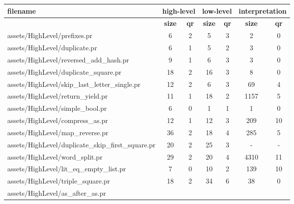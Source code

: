 \begin{tabular}{|l|c|c|c|c|c|c|}
    \toprule
    \textbf{filename} & \multicolumn{2}{c|}{\textbf{high-level}} & \multicolumn{2}{c|}{\textbf{low-level}} & \multicolumn{2}{c|}{\textbf{interpretation}} \\
    \midrule
                      & \textbf{size} & \textbf{qr} & \textbf{size} & \textbf{qr} & \textbf{size} & \textbf{qr} \\
    \midrule
            assets/HighLevel/prefixes.pr &
        6 & 2 &
         5 & 3  &
         2 & 0  \\
            assets/HighLevel/duplicate.pr &
        6 & 1 &
         5 & 2  &
         3 & 0  \\
            assets/HighLevel/reversed\_add\_hash.pr &
        9 & 1 &
         6 & 3  &
         3 & 0  \\
            assets/HighLevel/duplicate\_square.pr &
        18 & 2 &
         16 & 3  &
         8 & 0  \\
            assets/HighLevel/skip\_last\_letter\_single.pr &
        12 & 2 &
         6 & 3  &
         69 & 4  \\
            assets/HighLevel/return\_yield.pr &
        11 & 1 &
         18 & 2  &
         1157 & 5  \\
            assets/HighLevel/simple\_bool.pr &
        6 & 0 &
         1 & 1  &
         1 & 0  \\
            assets/HighLevel/compress\_as.pr &
        12 & 1 &
         12 & 3  &
         209 & 10  \\
            assets/HighLevel/map\_reverse.pr &
        36 & 2 &
         18 & 4  &
         285 & 5  \\
            assets/HighLevel/duplicate\_skip\_first\_square.pr &
        20 & 2 &
         25 & 3  &
         - & -  \\
            assets/HighLevel/word\_split.pr &
        29 & 2 &
         20 & 4  &
         4310 & 11  \\
            assets/HighLevel/lit\_eq\_empty\_list.pr &
        7 & 0 &
         10 & 2  &
         139 & 10  \\
            assets/HighLevel/triple\_square.pr &
        18 & 2 &
         34 & 6  &
         38 & 0  \\
            assets/HighLevel/as\_after\_as.pr &

\end{tabular}
